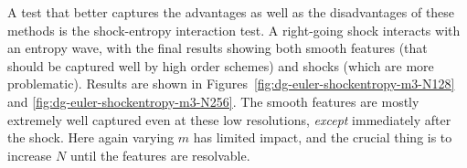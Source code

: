A test that better captures the advantages as well as the disadvantages of these
methods is the shock-entropy interaction test. A right-going shock interacts
with an entropy wave, with the final results showing both smooth features (that
should be captured well by high order schemes) and shocks (which are more
problematic). Results are shown in Figures~\ref{fig:dg-euler-shockentropy-m3-N128}
and \ref{fig:dg-euler-shockentropy-m3-N256}. The smooth features are mostly
extremely well captured even at these low resolutions, \emph{except} immediately
after the shock. Here again varying $m$ has limited impact, and the crucial
thing is to increase $N$ until the features are resolvable.

